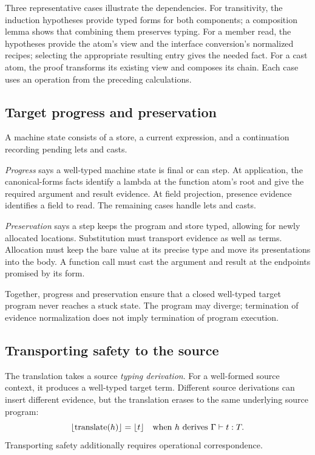 Three representative cases illustrate the dependencies. For transitivity,
the induction hypotheses
provide typed forms for both components; a composition lemma shows that
combining them preserves typing. For a member read, the hypotheses provide the atom's
view and the interface conversion's normalized recipes; selecting the
appropriate resulting entry gives the needed fact. For a cast atom,
the proof transforms its existing view and composes its chain.
Each case uses an operation from the preceding calculations.

\subsection*{Target progress and preservation}
A machine state consists of a store, a current expression, and a
continuation recording pending lets and casts.

\emph{Progress} says a well-typed machine state is final or can step.
At application, the canonical-forms facts identify a lambda at the
function atom's root and give the required argument and result evidence.
At field projection, presence evidence identifies a field to read.
The remaining cases handle lets and casts.

\emph{Preservation} says a step keeps the program and store typed,
allowing for newly allocated locations. Substitution must transport
evidence as well as terms. Allocation must keep the bare value at its
precise type and move its presentations into the body. A function call
must cast the argument and result at the endpoints promised by its form.

Together, progress and preservation ensure that a closed well-typed
target program never reaches a stuck state. The program may diverge;
termination of evidence normalization does not imply termination of
program execution.

\subsection*{Transporting safety to the source}
The translation takes a source \emph{typing derivation}.
For a well-formed source context, it produces a well-typed target term.
Different source derivations can insert different evidence,
but the translation erases to the same underlying source program:
\[
 \lfloor \operatorname{translate}(h)\rfloor=\lfloor t\rfloor
 \quad\text{when }h\text{ derives }\Gamma\vdash t:T.
\]
Transporting safety additionally requires operational correspondence.

